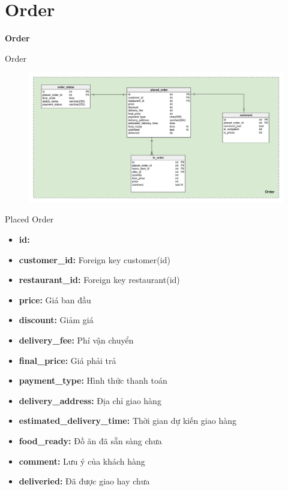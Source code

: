 \documentclass[aspectratio=43,xcolor=dvipsnames]{beamer}
\begin{document}
	\section{Order}
	\begin{frame}
		\textcolor{structure}{\Huge{\textbf{Order}}}
	\end{frame}
	\begin{frame}{Order}
		\begin{figure}[ht!]
			\centerline{\includegraphics[width=1\textwidth]{order.png}}
			\label{fig:ass1}
		\end{figure}
	\end{frame}
	\begin{frame}{Placed Order}
		\begin{itemize}
			\item \textbf{id:}
			\item \textbf{customer\_id:} Foreign key customer(id)
			\item \textbf{restaurant\_id:} Foreign key restaurant(id)
			\item \textbf{price:} Giá ban đầu
			\item \textbf{discount:} Giảm giá 
			\item \textbf{delivery\_fee: }Phí vận chuyển
			\item \textbf{final\_price:} Giá phải trả
			\item \textbf{payment\_type:} Hình thức thanh toán
			\item \textbf{delivery\_address:} Địa chỉ giao hàng 
			\item \textbf{estimated\_delivery\_time:} Thời gian dự kiến giao hàng
			\item \textbf{food\_ready:} Đồ ăn đã sẵn sàng chưa
			\item \textbf{comment:} Lưu ý của khách hàng
			\item \textbf{deliveried:} Đã được giao hay chưa
		\end{itemize}
	\end{frame}
	
\end{document}
